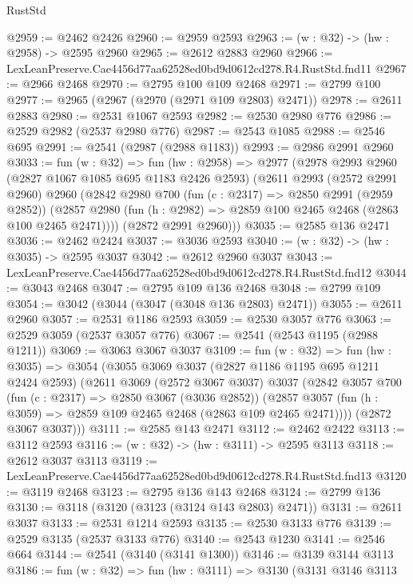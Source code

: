 \begin{lexlean}{RustStd}
\begin{coremodule}
@2959 := @2462 @2426
@2960 := @2959 @2593
@2963 := (w : @32) -> (hw : @2958) -> @2595 @2960
@2965 := @2612 @2883 @2960
@2966 := LexLeanPreserve.Cae4456d77aa62528ed0bd9d0612cd278.R4.RustStd.fnd11
@2967 := @2966 @2468
@2970 := @2795 @100 @109 @2468
@2971 := @2799 @100
@2977 := @2965 (@2967 (@2970 (@2971 @109 @2803) @2471))
@2978 := @2611 @2883
@2980 := @2531 @1067 @2593
@2982 := @2530 @2980 @776
@2986 := @2529 @2982 (@2537 @2980 @776)
@2987 := @2543 @1085
@2988 := @2546 @695
@2991 := @2541 (@2987 (@2988 @1183))
@2993 := @2986 @2991 @2960
@3033 := fun (w : @32) =>
  fun (hw : @2958) =>
  @2977
    (@2978
      @2993
      @2960
      (@2827 @1067 @1085 @695 @1183 @2426 @2593)
      (@2611
        @2993
        (@2572 @2991 @2960)
        @2960
        (@2842
          @2980
          @700
          (fun (c : @2317) => @2850 @2991 (@2959 @2852))
          (@2857 @2980 (fun (h : @2982) => @2859 @100 @2465 @2468 (@2863 @100 @2465 @2471))))
        (@2872 @2991 @2960)))
@3035 := @2585 @136 @2471
@3036 := @2462 @2424
@3037 := @3036 @2593
@3040 := (w : @32) -> (hw : @3035) -> @2595 @3037
@3042 := @2612 @2960 @3037
@3043 := LexLeanPreserve.Cae4456d77aa62528ed0bd9d0612cd278.R4.RustStd.fnd12
@3044 := @3043 @2468
@3047 := @2795 @109 @136 @2468
@3048 := @2799 @109
@3054 := @3042 (@3044 (@3047 (@3048 @136 @2803) @2471))
@3055 := @2611 @2960
@3057 := @2531 @1186 @2593
@3059 := @2530 @3057 @776
@3063 := @2529 @3059 (@2537 @3057 @776)
@3067 := @2541 (@2543 @1195 (@2988 @1211))
@3069 := @3063 @3067 @3037
@3109 := fun (w : @32) =>
  fun (hw : @3035) =>
  @3054
    (@3055
      @3069
      @3037
      (@2827 @1186 @1195 @695 @1211 @2424 @2593)
      (@2611
        @3069
        (@2572 @3067 @3037)
        @3037
        (@2842
          @3057
          @700
          (fun (c : @2317) => @2850 @3067 (@3036 @2852))
          (@2857 @3057 (fun (h : @3059) => @2859 @109 @2465 @2468 (@2863 @109 @2465 @2471))))
        (@2872 @3067 @3037)))
@3111 := @2585 @143 @2471
@3112 := @2462 @2422
@3113 := @3112 @2593
@3116 := (w : @32) -> (hw : @3111) -> @2595 @3113
@3118 := @2612 @3037 @3113
@3119 := LexLeanPreserve.Cae4456d77aa62528ed0bd9d0612cd278.R4.RustStd.fnd13
@3120 := @3119 @2468
@3123 := @2795 @136 @143 @2468
@3124 := @2799 @136
@3130 := @3118 (@3120 (@3123 (@3124 @143 @2803) @2471))
@3131 := @2611 @3037
@3133 := @2531 @1214 @2593
@3135 := @2530 @3133 @776
@3139 := @2529 @3135 (@2537 @3133 @776)
@3140 := @2543 @1230
@3141 := @2546 @664
@3144 := @2541 (@3140 (@3141 @1300))
@3146 := @3139 @3144 @3113
@3186 := fun (w : @32) =>
  fun (hw : @3111) =>
  @3130
    (@3131
      @3146
      @3113

\end{coremodule}
\end{lexlean}
